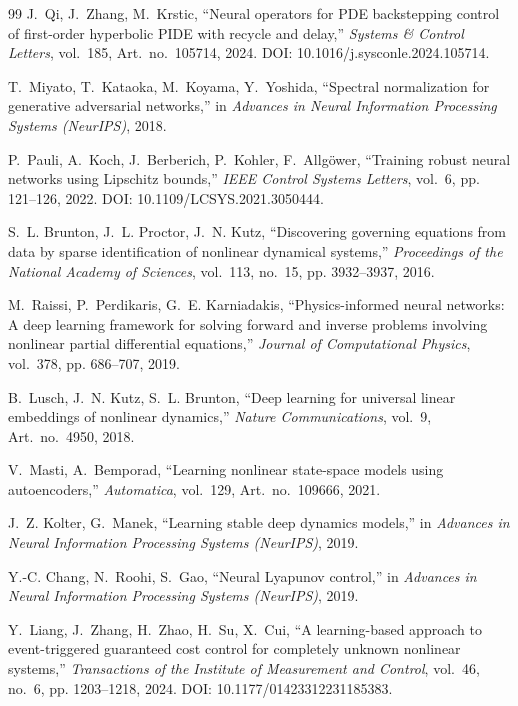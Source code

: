 \documentclass[11pt,sagev,times]{sagej}
\begin{document}
\begin{thebibliography}{99}
J.~Qi, J.~Zhang, M.~Krstic,
``Neural operators for PDE backstepping control of first-order hyperbolic
PIDE with recycle and delay,''
\emph{Systems \& Control Letters}, vol.~185, Art.\ no.\ 105714, 2024.
DOI: 10.1016/j.sysconle.2024.105714.

T.~Miyato, T.~Kataoka, M.~Koyama, Y.~Yoshida,
``Spectral normalization for generative adversarial networks,''
in \emph{Advances in Neural Information Processing Systems (NeurIPS)}, 2018.

P.~Pauli, A.~Koch, J.~Berberich, P.~Kohler, F.~Allg{\"o}wer,
``Training robust neural networks using Lipschitz bounds,''
\emph{IEEE Control Systems Letters}, vol.~6, pp. 121--126, 2022.
DOI: 10.1109/LCSYS.2021.3050444.

S.~L. Brunton, J.~L. Proctor, J.~N. Kutz,
``Discovering governing equations from data by sparse identification of
nonlinear dynamical systems,''
\emph{Proceedings of the National Academy of Sciences}, vol.~113, no.~15,
pp. 3932--3937, 2016.

M.~Raissi, P.~Perdikaris, G.~E. Karniadakis,
``Physics-informed neural networks: A deep learning framework for solving
forward and inverse problems involving nonlinear partial differential
equations,''
\emph{Journal of Computational Physics}, vol.~378, pp. 686--707, 2019.

B.~Lusch, J.~N. Kutz, S.~L. Brunton,
``Deep learning for universal linear embeddings of nonlinear dynamics,''
\emph{Nature Communications}, vol.~9, Art.\ no.\ 4950, 2018.

V.~Masti, A.~Bemporad,
``Learning nonlinear state-space models using autoencoders,''
\emph{Automatica}, vol.~129, Art.\ no.\ 109666, 2021.

J.~Z. Kolter, G.~Manek,
``Learning stable deep dynamics models,''
in \emph{Advances in Neural Information Processing Systems (NeurIPS)}, 2019.

Y.-C. Chang, N.~Roohi, S.~Gao,
``Neural Lyapunov control,''
in \emph{Advances in Neural Information Processing Systems (NeurIPS)}, 2019.

Y.~Liang, J.~Zhang, H.~Zhao, H.~Su, X.~Cui,
``A learning-based approach to event-triggered guaranteed cost control
for completely unknown nonlinear systems,''
\emph{Transactions of the Institute of Measurement and Control},
vol.~46, no.~6, pp. 1203--1218, 2024. DOI: 10.1177/01423312231185383.


\end{thebibliography}
\end{document}
